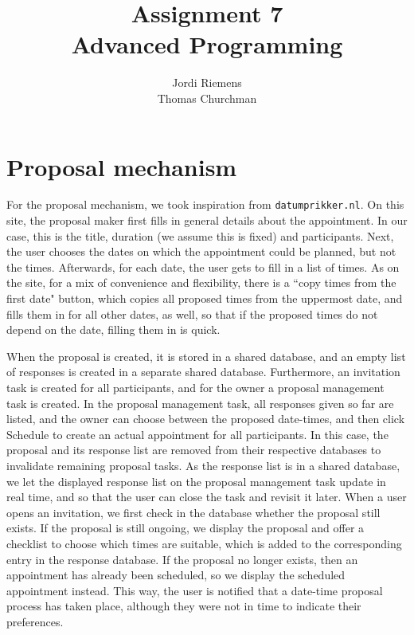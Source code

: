 \documentclass{article}
\title{Assignment 7\\\normalsize{Advanced Programming}}
\author{Jordi Riemens\\Thomas Churchman}
\begin{document}
	\maketitle
	
	\section{Proposal mechanism}
    For the proposal mechanism, we took inspiration from \texttt{datumprikker.nl}.
    On this site, the proposal maker first fills in general details about the appointment. In our case, this is the title, duration (we assume this is fixed) and participants.
    Next, the user chooses the dates on which the appointment could be planned, but not the times. Afterwards, for each date, the user gets to fill in a list of times.
    As on the site, for a mix of convenience and flexibility, there is a ``copy times from the first date" button, which copies all proposed times from the uppermost date,
    and fills them in for all other dates, as well, so that if the proposed times do not depend on the date, filling them in is quick.
    
    When the proposal is created, it is stored in a shared database, and an empty list of responses is created in a separate shared database.
    Furthermore, an invitation task is created for all participants, and for the owner a proposal management task is created.
    In the proposal management task, all responses given so far are listed, and the owner can choose between the proposed date-times, and then click Schedule to create an actual appointment for all participants.
    In this case, the proposal and its response list are removed from their respective databases to invalidate remaining proposal tasks.
    As the response list is in a shared database, we let the displayed response list on the proposal management task update in real time, and so that the user can close the task and revisit it later.
    When a user opens an invitation, we first check in the database whether the proposal still exists.
    If the proposal is still ongoing, we display the proposal and offer a checklist to choose which times are suitable, which is added to the corresponding entry in the response database.
    If the proposal no longer exists, then an appointment has already been scheduled, so we display the scheduled appointment instead.
    This way, the user is notified that a date-time proposal process has taken place, although they were not in time to indicate their preferences.
    
\end{document}
